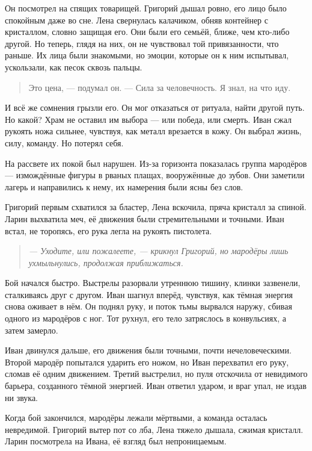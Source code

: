 \documentclass[12pt,a4paper]{book}
\newenvironment{dialogue}{\begin{quote}\itshape}{\end{quote}}
\begin{document}
Он посмотрел на спящих товарищей. Григорий дышал ровно, его лицо было спокойным даже во сне. Лена свернулась калачиком, обняв контейнер с кристаллом, словно защищая его. Они были его семьёй, ближе, чем кто-либо другой. Но теперь, глядя на них, он не чувствовал той привязанности, что раньше. Их лица были знакомыми, но эмоции, которые он к ним испытывал, ускользали, как песок сквозь пальцы.

\begin{quote}
Это цена, --- подумал он. --- Сила за человечность. Я знал, на что иду.
\end{quote}

И всё же сомнения грызли его. Он мог отказаться от ритуала, найти другой путь. Но какой? Храм не оставил им выбора --- или победа, или смерть. Иван сжал рукоять ножа сильнее, чувствуя, как металл врезается в кожу. Он выбрал жизнь, силу, команду. Но потерял себя.

На рассвете их покой был нарушен. Из-за горизонта показалась группа мародёров --- измождённые фигуры в рваных плащах, вооружённые до зубов. Они заметили лагерь и направились к нему, их намерения были ясны без слов.

Григорий первым схватился за бластер, Лена вскочила, пряча кристалл за спиной. Ларин выхватила меч, её движения были стремительными и точными. Иван встал, не торопясь, его рука легла на рукоять пистолета.

\begin{dialogue}
--- Уходите, или пожалеете, --- крикнул Григорий, но мародёры лишь ухмыльнулись, продолжая приближаться.
\end{dialogue}

Бой начался быстро. Выстрелы разорвали утреннюю тишину, клинки зазвенели, сталкиваясь друг с другом. Иван шагнул вперёд, чувствуя, как тёмная энергия снова оживает в нём. Он поднял руку, и поток тьмы вырвался наружу, сбивая одного из мародёров с ног. Тот рухнул, его тело затряслось в конвульсиях, а затем замерло.

Иван двинулся дальше, его движения были точными, почти нечеловеческими. Второй мародёр попытался ударить его ножом, но Иван перехватил его руку, сломав её одним движением. Третий выстрелил, но пуля отскочила от невидимого барьера, созданного тёмной энергией. Иван ответил ударом, и враг упал, не издав ни звука.

Когда бой закончился, мародёры лежали мёртвыми, а команда осталась невредимой. Григорий вытер пот со лба, Лена тяжело дышала, сжимая кристалл. Ларин посмотрела на Ивана, её взгляд был непроницаемым.
\end{document}
